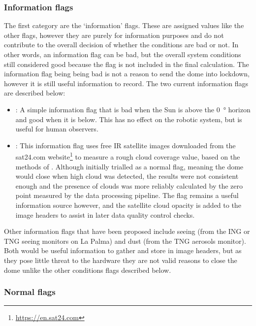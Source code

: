 \begin{colsection}
\clearpage

\subsubsection{Information flags}

The first category are the `information' flags. These are assigned values like the other flags, however they are purely for information purposes and do not contribute to the overall decision of whether the conditions are bad or not. In other words, an information flag can be bad, but the overall system conditions still considered good because the flag is not included in the final calculation. The information flag being being bad is not a reason to send the dome into lockdown, however it is still useful information to record. The two current information flags are described below:

\begin{itemize}
    \item {}: A simple information flag that is bad when the Sun is above the \SI{0}{\degree} horizon and good when it is below. This has no effect on the robotic system, but is useful for human observers.

    \item {}: This information flag uses free IR satellite images downloaded from the sat24.com website\footnote{\url{https://en.sat24.com}} to measure a rough cloud coverage value, based on the methods of \citet{clouds}. Although initially trialled as a normal flag, meaning the dome would close when high cloud was detected, the results were not consistent enough and the presence of clouds was more reliably calculated by the zero point measured by the data processing pipeline. The flag remains a useful information source however, and the satellite cloud opacity is added to the image headers to assist in later data quality control checks.
\end{itemize}

Other information flags that have been proposed include seeing (from the ING or TNG seeing monitors on La Palma) and dust (from the TNG aerosols monitor). Both would be useful information to gather and store in image headers, but as they pose little threat to the hardware they are not valid reasons to close the dome unlike the other conditions flags described below.

\newpage

\subsubsection{Normal flags}


\end{colsection}
